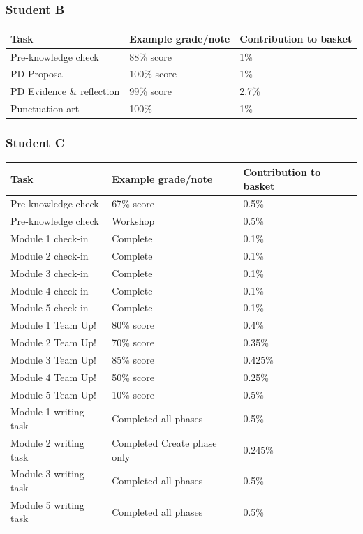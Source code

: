 \documentclass[
  openany]{book}
\begin{document}
\hypertarget{student-b}{%
\subsubsection{Student B}\label{student-b}}

\begin{longtable}[]{@{}lll@{}}
\toprule
Task & Example grade/note & Contribution to basket \\
\midrule
\endhead
Pre-knowledge check & 88\% score & 1\% \\
PD Proposal & 100\% score & 1\% \\
PD Evidence \& reflection & 99\% score & 2.7\% \\
Punctuation art & 100\% & 1\% \\
\bottomrule
\end{longtable}

\hypertarget{student-c}{%
\subsubsection{Student C}\label{student-c}}

\begin{longtable}[]{@{}lll@{}}
\toprule
Task & Example grade/note & Contribution to basket \\
\midrule
\endhead
Pre-knowledge check & 67\% score & 0.5\% \\
Pre-knowledge check & Workshop & 0.5\% \\
Module 1 check-in & Complete & 0.1\% \\
Module 2 check-in & Complete & 0.1\% \\
Module 3 check-in & Complete & 0.1\% \\
Module 4 check-in & Complete & 0.1\% \\
Module 5 check-in & Complete & 0.1\% \\
Module 1 Team Up! & 80\% score & 0.4\% \\
Module 2 Team Up! & 70\% score & 0.35\% \\
Module 3 Team Up! & 85\% score & 0.425\% \\
Module 4 Team Up! & 50\% score & 0.25\% \\
Module 5 Team Up! & 10\% score & 0.5\% \\
Module 1 writing task & Completed all phases & 0.5\% \\
Module 2 writing task & Completed Create phase only & 0.245\% \\
Module 3 writing task & Completed all phases & 0.5\% \\
Module 5 writing task & Completed all phases & 0.5\% \\
\bottomrule
\end{longtable}
\end{document}
